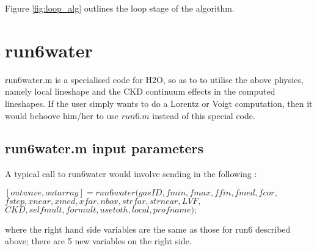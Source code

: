 \documentclass[11pt]{article}
\begin{document}
Figure \ref{fig:loop_alg} outlines the loop stage of the algorithm.

\section{run6water}

run6water.m is a specialised code for H2O, so as to to utilise the above 
physics, namely local lineshape and the CKD continuum effects in the 
computed 
lineshapes. If the user simply wants to do a Lorentz or Voigt computation,
then it would behoove him/her to use $run6.m$ instead of this special code.

\subsection{run6water.m input parameters}

A typical call to run6water would involve sending in the following : 

$[outwave,outarray]=run6water(gasID,fmin,fmax,ffin,fmed,fcor,$\\
              $fstep,xnear,xmed,xfar,nbox,strfar,strnear,LVF,$\\
              $CKD,selfmult,formult,usetoth,local,profname);$

where the right hand side variables are the same as those for run6 
described above; there are 5 new variables on the right side.
\end{document}

